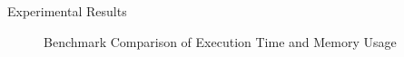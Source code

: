 \documentclass{beamer}
\begin{document}
\begin{frame}{Experimental Results}
\begin{figure}[h!]
  
  \caption{Benchmark Comparison of Execution Time and Memory Usage}
  \label{fig:benchmark_comparison}
\end{figure}

\end{frame}
\end{document}

